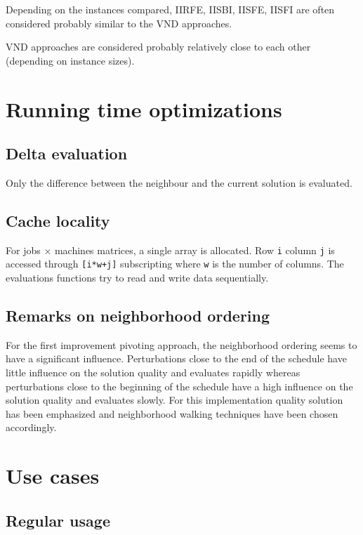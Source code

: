 \documentclass[a4paper,12pt]{article}
\begin{document}
Depending on the instances compared, IIRFE, IISBI, IISFE, IISFI are often considered probably similar to the VND approaches.

VND approaches are considered probably relatively close to each other (depending on instance sizes).
\newpage\cleardoublepage{}
\section{Running time optimizations}

\subsection{Delta evaluation}

Only the difference between the neighbour and the current solution is evaluated.

\subsection{Cache locality}

For jobs $\times$ machines matrices, a single array is allocated. Row \verb!i! column \verb!j! is accessed through \verb![i*w+j]! subscripting where \verb!w! is the number of columns. The evaluations functions try to read and write data sequentially.

\subsection{Remarks on neighborhood ordering}

For the first improvement pivoting approach, the neighborhood ordering seems to have a significant influence. Perturbations close to the end of the schedule have little influence on the solution quality and evaluates rapidly whereas perturbations close to the beginning of the schedule have a high influence on the solution quality and evaluates slowly. For this implementation quality solution has been emphasized and neighborhood walking techniques have been chosen accordingly.
\newpage\cleardoublepage{}
\section{Use cases}

\subsection{Regular usage}
\end{document}

